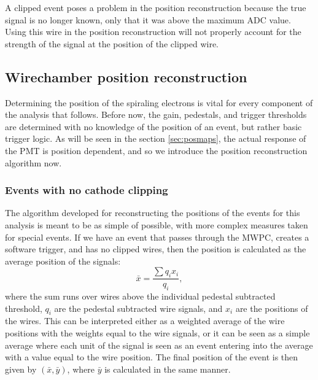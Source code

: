 A clipped event poses a problem in the position reconstruction because the true signal
is no longer known, only that it was above the maximum ADC value. Using this wire in
the position reconstruction will not properly account for the strength of the
signal at the position of the clipped wire.

\subsection{Wirechamber position reconstruction}

Determining the position of the spiraling electrons is vital for every component of the analysis
that follows. Before now, the gain, pedestals, and trigger thresholds are determined with no
knowledge of the position of an event, but rather basic trigger logic. As will be seen in
the section \ref{sec:posmaps}, the actual response of the PMT is position dependent, and so we introduce the
position reconstruction algorithm now.

\subsubsection{Events with no cathode clipping}

The algorithm developed for reconstructing the positions of the events for this analysis
is meant to be as simple of possible, with more complex measures taken for special events.
If we have an event that passes through the MWPC, creates a software trigger, and has no
clipped wires, then the position is calculated as the average position of the signals:
%
\begin{equation}
  \bar{x} = \frac{\sum q_i x_i}{q_i},
\end{equation}
%
where the sum runs over wires above the individual pedestal subtracted threshold, $q_i$ are the
pedestal subtracted wire signals, and $x_i$ are the positions of the wires.  This can
be interpreted either as a weighted average of the wire positions with the weights equal to
the wire signals, or it can be seen as a simple average where each unit of the signal is seen
as an event entering into the average with a value equal to the wire position. The final position
of the event is then given by $(\bar{x}, \bar{y})$, where $\bar{y}$ is calculated in the same manner.

